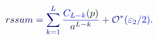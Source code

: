 \documentclass[12pt]{article}
\begin{document}
\makeatletter
\renewcommand*{\@textcolor}[3]{%
  \protect\leavevmode
  \begingroup
    \color#1{#2}#3%
  \endgroup
}
\makeatother
\begin{displaymath}
\mathcolor[RGB]{0,0,15}{\mathsf} { \mathcolor[RGB]{0,0,30}{r} \mathcolor[RGB]{0,0,45}{s} \mathcolor[RGB]{0,0,60}{s} \mathcolor[RGB]{0,0,75}{u} \mathcolor[RGB]{0,0,90}{m} } \mathcolor[RGB]{0,0,105}{=} \mathcolor[RGB]{0,0,120}{\sum} _ { \mathcolor[RGB]{0,0,135}{k} \mathcolor[RGB]{0,0,150}{=} \mathcolor[RGB]{0,0,165}{1} } ^ { \mathcolor[RGB]{0,0,180}{L} } \mathcolor[RGB]{0,0,195}{\frac { \mathcolor[RGB]{0,0,210}{C} _ { \mathcolor[RGB]{0,0,225}{L} \mathcolor[RGB]{0,0,240}{-} \mathcolor[RGB]{0,0,255}{k} } \mathcolor[RGB]{0,15,0}{(} \mathcolor[RGB]{0,15,15}{p} \mathcolor[RGB]{0,15,30}{)} } { \mathcolor[RGB]{0,15,45}{a} ^ { \mathcolor[RGB]{0,15,60}{L} \mathcolor[RGB]{0,15,75}{-} \mathcolor[RGB]{0,15,90}{k} } } } \mathcolor[RGB]{0,15,105}{+} \mathcal { \mathcolor[RGB]{0,15,120}{O} } ^ { \mathcolor[RGB]{0,15,135}{*} } \mathcolor[RGB]{0,15,150}{(} \mathcolor[RGB]{0,15,165}{\varepsilon} _ { \mathcolor[RGB]{0,15,180}{2} } \mathcolor[RGB]{0,15,195}{/} \mathcolor[RGB]{0,15,210}{2} \mathcolor[RGB]{0,15,225}{)} \mathcolor[RGB]{0,15,240}{.}
\end{displaymath}
\end{document}
